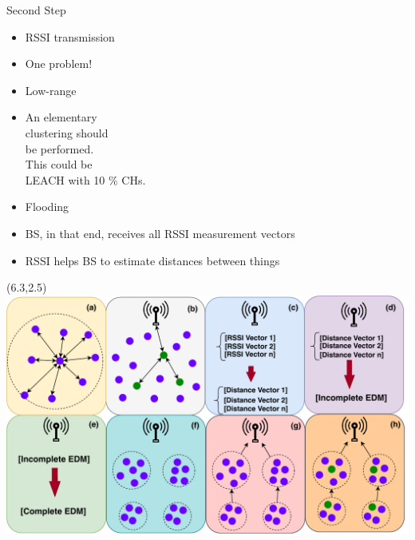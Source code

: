\documentclass{beamer}
\begin{document}
\begin{frame}[t]{Second Step} %

\begin{itemize}

\item RSSI transmission

\item One problem!

\item Low-range

\item An elementary \\ clustering should \\ be performed. \\ This could be \\ LEACH with 10 \% CHs.

\item Flooding

\item BS, in that end, receives all RSSI measurement vectors

\item RSSI helps BS to estimate distances between things
\end{itemize}


\begin{textblock}{0.8}(6.3,2.5)
\includegraphics[scale=0.35]{figure/Steps.pdf}
\end{textblock}
\end{frame}
\end{document}
